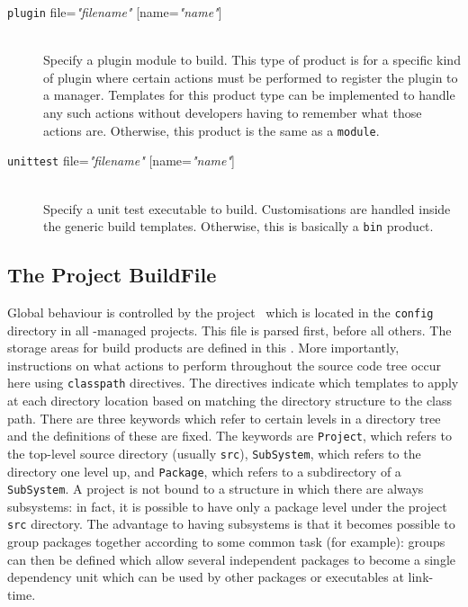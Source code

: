 \begin{description}
\item[\lbkt\texttt{plugin} file=\textit{"filename"} {[}name=\textit{"name"}{]}\rbkt{}]\mbox{}\\
  Specify a plugin module to build. This type of product is for a
  specific kind of plugin where certain actions must be performed to
  register the plugin to a manager. Templates for this product type
  can be implemented to handle any such actions without developers
  having to remember what those actions are. Otherwise, this product
  is the same as a \texttt{module}.

\item[\lbkt\texttt{unittest} file=\textit{"filename"} {[}name=\textit{"name"}{]}\rbkt{}]\mbox{}\\
  Specify a unit test executable to build. Customisations are handled
  inside the generic build templates. Otherwise, this is basically a
  \texttt{bin} product.

%
\end{description}



\subsection{The Project BuildFile}\label{sec:projectbuildfile}

Global behaviour is controlled by the project \buildfile\ which is
located in the \texttt{config} directory in all \scram-managed
projects. This file is parsed first, before all others. The
storage areas for build products are defined in this \buildfile. More
importantly, instructions on what actions to perform throughout the
source code tree occur here using \texttt{classpath} directives.
The directives indicate which templates to apply at each directory
location based on matching the directory structure to the class path. 
There are three keywords which refer to certain levels in a directory
tree and the definitions of these are fixed. The keywords are
\texttt{Project}, which refers to the top-level source directory
(usually \texttt{src}), \texttt{SubSystem}, which refers to the
directory one level up, and \texttt{Package}, which refers to a
subdirectory of a \texttt{SubSystem}. A project is not bound to a
structure in which there are always subsystems: in fact, it is
possible to have only a package level under the project \texttt{src}
directory. The advantage to having subsystems is that it becomes
possible to group packages together according to some common task (for
example): groups can then be defined which allow several independent
packages to become a single dependency unit which can be used by other
packages or executables at link-time.


